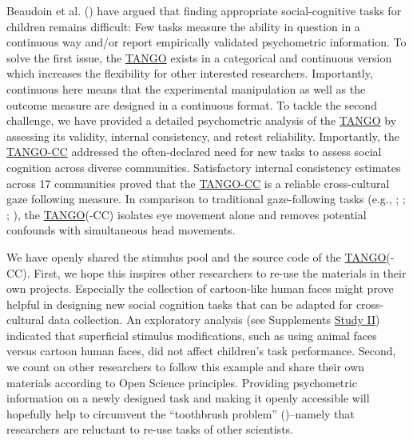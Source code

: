 \documentclass[
]{scrbook}
\begin{document}
Beaudoin et al. () have argued that finding appropriate social-cognitive tasks for children remains difficult: Few tasks measure the ability in question in a continuous way and/or report empirically validated psychometric information. To solve the first issue, the \hyperref[acronyms_TANGO]{TANGO} exists in a categorical and continuous version which increases the flexibility for other interested researchers. Importantly, continuous here means that the experimental manipulation as well as the outcome measure are designed in a continuous format. To tackle the second challenge, we have provided a detailed psychometric analysis of the \hyperref[acronyms_TANGO]{TANGO} by assessing its validity, internal consistency, and retest reliability. Importantly, the \hyperref[acronyms_TANGO-CC]{TANGO-CC} addressed the often-declared need for new tasks to assess social cognition across diverse communities. Satisfactory internal consistency estimates across 17 communities proved that the \hyperref[acronyms_TANGO-CC]{TANGO-CC} is a reliable cross-cultural gaze following measure. In comparison to traditional gaze-following tasks (e.g., ; ; ; ), the \hyperref[acronyms_TANGO]{TANGO}(-CC) isolates eye movement alone and removes potential confounds with simultaneous head movements.

We have openly shared the stimulus pool and the source code of the \hyperref[acronyms_TANGO]{TANGO}(-CC). First, we hope this inspires other researchers to re-use the materials in their own projects. Especially the collection of cartoon-like human faces might prove helpful in designing new social cognition tasks that can be adapted for cross-cultural data collection. An exploratory analysis (see Supplements \hyperref[studyII]{Study II}) indicated that superficial stimulus modifications, such as using animal faces versus cartoon human faces, did not affect children's task performance. Second, we count on other researchers to follow this example and share their own materials according to Open Science principles. Providing psychometric information on a newly designed task and making it openly accessible will hopefully help to circumvent the ``toothbrush problem'' ()\thinspace --\thinspace namely that researchers are reluctant to re-use tasks of other scientists.
\end{document}
